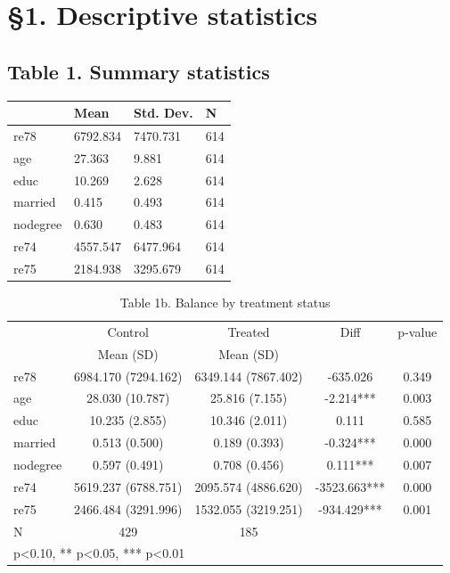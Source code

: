 \section{§1. Descriptive statistics}

\subsection*{Table 1. Summary statistics}
\begin{tabular}{llll}
\toprule
 & Mean & Std. Dev. & N \\
\midrule
re78 & 6792.834 & 7470.731 & 614 \\
age & 27.363 & 9.881 & 614 \\
educ & 10.269 & 2.628 & 614 \\
married & 0.415 & 0.493 & 614 \\
nodegree & 0.630 & 0.483 & 614 \\
re74 & 4557.547 & 6477.964 & 614 \\
re75 & 2184.938 & 3295.679 & 614 \\
\bottomrule
\end{tabular}


\begin{table}[htbp]
\centering
\caption{Table 1b. Balance by treatment status}
\begin{tabular}{lcccc}
\hline\hline
 & Control & Treated & Diff & p-value \\
 & Mean (SD) & Mean (SD) & & \\
\hline
re78 & 6984.170 (7294.162) & 6349.144 (7867.402) & -635.026 & 0.349 \\
age & 28.030 (10.787) & 25.816 (7.155) & -2.214*** & 0.003 \\
educ & 10.235 (2.855) & 10.346 (2.011) & 0.111 & 0.585 \\
married & 0.513 (0.500) & 0.189 (0.393) & -0.324*** & 0.000 \\
nodegree & 0.597 (0.491) & 0.708 (0.456) & 0.111*** & 0.007 \\
re74 & 5619.237 (6788.751) & 2095.574 (4886.620) & -3523.663*** & 0.000 \\
re75 & 2466.484 (3291.996) & 1532.055 (3219.251) & -934.429*** & 0.001 \\
\hline
N & 429 & 185 & & \\
\hline\hline
\multicolumn{5}{l}{\footnotesize * p<0.10, ** p<0.05, *** p<0.01} \\
\end{tabular}
\end{table}

